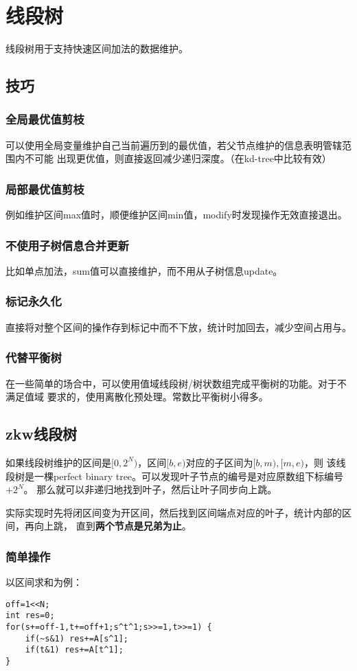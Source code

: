 \section{线段树}
线段树用于支持快速区间加法的数据维护。
\subsection{技巧}
\subsubsection{全局最优值剪枝}
可以使用全局变量维护自己当前遍历到的最优值，若父节点维护的信息表明管辖范围内不可能
出现更优值，则直接返回减少递归深度。（在kd-tree中比较有效）
\subsubsection{局部最优值剪枝}
例如维护区间max值时，顺便维护区间min值，modify时发现操作无效直接退出。
\subsubsection{不使用子树信息合并更新}
比如单点加法，sum值可以直接维护，而不用从子树信息update。
\subsubsection{标记永久化}
直接将对整个区间的操作存到标记中而不下放，统计时加回去，减少空间占用与。
\subsubsection{代替平衡树}
在一些简单的场合中，可以使用值域线段树/树状数组完成平衡树的功能。对于不满足值域
要求的，使用离散化预处理。常数比平衡树小得多。
\subsection{zkw线段树}
如果线段树维护的区间是$[0,2^N)$，区间$[b,e)$对应的子区间为$[b,m),[m,e)$，则
该线段树是一棵perfect binary tree。可以发现叶子节点的编号是对应原数组下标编号$+2^N$。
那么就可以非递归地找到叶子，然后让叶子同步向上跳。

实际实现时先将闭区间变为开区间，然后找到区间端点对应的叶子，统计内部的区间，再向上跳，
直到{\bfseries 两个节点是兄弟为止}。

\subsubsection{简单操作}
以区间求和为例：
\begin{lstlisting}
off=1<<N;
int res=0;
for(s+=off-1,t+=off+1;s^t^1;s>>=1,t>>=1) {
    if(~s&1) res+=A[s^1];
    if(t&1) res+=A[t^1];
}
\end{lstlisting}

